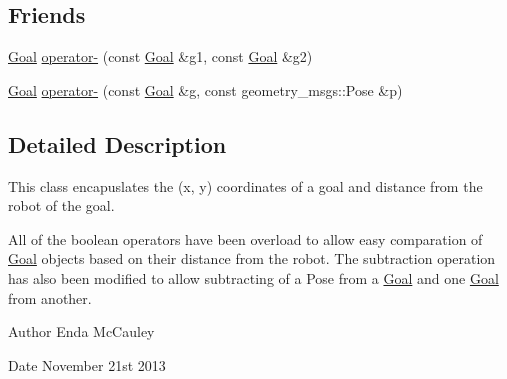 \subsection*{\-Friends}
\begin{DoxyCompactItemize}
\item 
\hyperlink{classGoal}{\-Goal} \hyperlink{classGoal_ac37c7e2fe74a4e8107fac986e06b8ec3}{operator-\/} (const \hyperlink{classGoal}{\-Goal} \&g1, const \hyperlink{classGoal}{\-Goal} \&g2)
\item 
\hyperlink{classGoal}{\-Goal} \hyperlink{classGoal_a5f7f5b02c5873dd740dd99d9fde0233f}{operator-\/} (const \hyperlink{classGoal}{\-Goal} \&g, const geometry\-\_\-msgs\-::\-Pose \&p)
\end{DoxyCompactItemize}


\subsection{\-Detailed \-Description}
\-This class encapuslates the (x, y) coordinates of a goal and distance from the robot of the goal. 

\-All of the boolean operators have been overload to allow easy comparation of \hyperlink{classGoal}{\-Goal} objects based on their distance from the robot. \-The subtraction operation has also been modified to allow subtracting of a \-Pose from a \hyperlink{classGoal}{\-Goal} and one \hyperlink{classGoal}{\-Goal} from another.

\begin{DoxyAuthor}{\-Author}
\-Enda \-Mc\-Cauley 
\end{DoxyAuthor}
\begin{DoxyDate}{\-Date}
\-November 21st 2013 
\end{DoxyDate}


